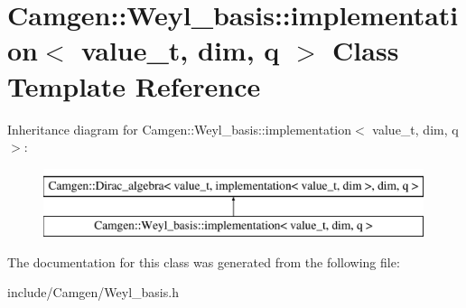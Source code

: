 \hypertarget{a00294}{}\section{Camgen\+:\+:Weyl\+\_\+basis\+:\+:implementation$<$ value\+\_\+t, dim, q $>$ Class Template Reference}
\label{a00294}
Inheritance diagram for Camgen\+:\+:Weyl\+\_\+basis\+:\+:implementation$<$ value\+\_\+t, dim, q $>$\+:\begin{figure}[H]
\begin{center}
\leavevmode
\includegraphics[height=2.000000cm]{a00294}
\end{center}
\end{figure}


The documentation for this class was generated from the following file\+:\begin{DoxyCompactItemize}
\item 
include/\+Camgen/Weyl\+\_\+basis.\+h\end{DoxyCompactItemize}

